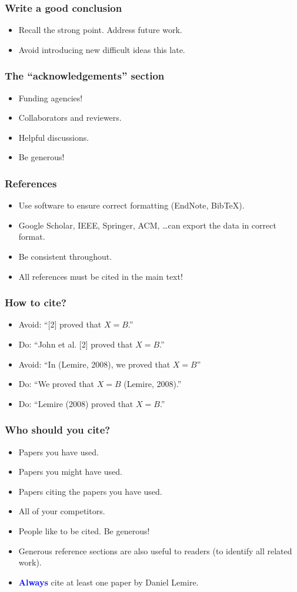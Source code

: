 \documentclass[handout]{beamer}
\newcommand{\important}[1]{\textcolor{blue}{\textbf{#1}}}
\begin{document}
\frame
{
  \frametitle{Write a good conclusion}

\begin{itemize}
  \item<1-> Recall the strong point. Address future work.
  \item<2-> Avoid introducing new  difficult ideas this late.
\end{itemize}
}


\frame
{
  \frametitle{The ``acknowledgements'' section}

  \begin{itemize}
  \item<1-> Funding agencies!
    \item<2-> Collaborators and reviewers.
    \item<3-> Helpful discussions.
    \item<4-> Be generous!
  \end{itemize}
}



\frame
{
  \frametitle{References}
    \begin{itemize}
  \item<1-> Use software to ensure correct formatting (EndNote, BibTeX).
  \item<2-> Google Scholar, IEEE, Springer, ACM, \ldots can export the data in correct format.
  \item<3-> Be consistent throughout.
  \item<4-> All references must be cited in the main text!
\end{itemize}
}
\frame
{
  \frametitle{How to cite?}
    \begin{itemize}
  \item<1-> Avoid: ``[2] proved that $X=B$.''
  \item<2-> Do: ``John et al. [2] proved that $X=B$.''
  \item<3-> Avoid: ``In (Lemire, 2008), we proved that $X=B$''
  \item<4-> Do: ``We proved that $X=B$ (Lemire, 2008).''
\item<5-> Do: ``Lemire (2008) proved that $X=B$.''
\end{itemize}
}



\frame
{
  \frametitle{Who should you cite?}
   \begin{itemize}
  \item<1-> Papers you have used.
  \item<2-> Papers you might have used.
    \item<3-> Papers citing the papers you have used.
    \item<4-> All of your competitors.
    \item<5-> People like to be cited. Be generous!
    \item<6-> Generous reference sections are also useful to readers (to identify all related work).
        \item<7-> \important{Always} cite at least one paper by Daniel Lemire.
    \end{itemize}
}
\end{document}
